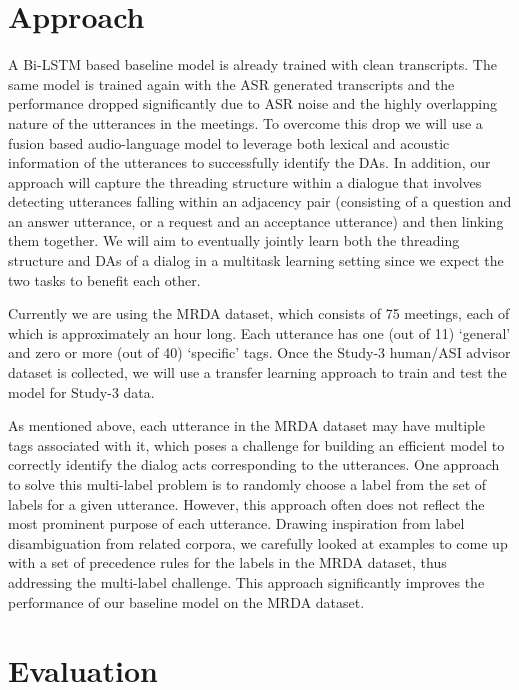 \section{Approach}

A Bi-LSTM based baseline model is already trained with clean transcripts. The
same model is trained again with the ASR generated transcripts and the
performance dropped significantly due to ASR noise and the highly overlapping
nature of the utterances in the meetings. To overcome this drop we will use a
fusion based audio-language model to leverage both lexical and acoustic
information of the utterances to successfully identify the DAs. In addition,
our approach will capture the threading structure within a dialogue that
involves detecting utterances falling within an adjacency pair (consisting of a
question and an answer utterance, or a request and an acceptance utterance) and
then linking them together. We will aim to eventually jointly learn both the
threading structure and DAs of a dialog in a multitask learning setting since
we expect the two tasks to benefit each other.

Currently we are using the MRDA dataset, which consists of 75 meetings, each of
which is approximately an hour long. Each utterance has one (out of 11)
`general' and zero or more (out of 40) `specific' tags. Once the Study-3
human/ASI advisor dataset is collected, we will use a transfer learning
approach to train and test the model for Study-3 data.

As mentioned above, each utterance in the MRDA dataset may have multiple tags
associated with it, which poses a challenge for building an efficient model to
correctly identify the dialog acts corresponding to the utterances.  One
approach to solve this multi-label problem is to randomly choose a label from
the set of labels for a given utterance. However, this approach often does not
reflect the most prominent purpose of each utterance. Drawing inspiration from
label disambiguation from related corpora, we carefully looked at examples to
come up with a set of precedence rules for the labels in the MRDA dataset, thus
addressing the multi-label challenge. This approach significantly improves the
performance of our baseline model on the MRDA dataset.

\section{Evaluation}

